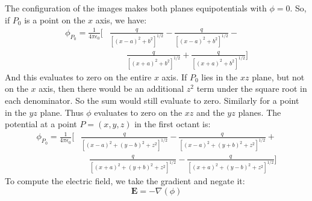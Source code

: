 \documentclass[crop=false,class=book,oneside]{standalone}
\begin{document}
            \begin{solution}
                The configuration of the images makes both planes
                equipotentials with $\phi=0$. So, if
                $P_{0}$ is a point on the $x$ axis, we have:
                \begin{equation}
                    \begin{split}
                        \phi_{P_{0}}=
                        \frac{1}{4\pi\epsilon_{0}}\Big[
                            &
                            \frac{q}{[(x-a)^{2}+b^{2}]^{1/2}}-
                            \frac{q}{[(x-a)^{2}+b^{2}]^{1/2}}-\\
                            &
                            \quad\quad
                            \frac{q}{[(x+a)^{2}+b^{2}]^{1/2}}+
                            \frac{q}{[(x+a)^{2}+b^{2}]^{1/2}}\Big]
                    \end{split}
                \end{equation}
                And this evaluates to zero on the entire $x$ axis.
                If $P_{0}$ lies in the $xz$ plane, but not on the
                $x$ axis, then there would be an additional $z^{2}$
                term under the square root in each denominator. So
                the sum would still evaluate to zero. Similarly for
                a point in the $yz$ plane. Thus $\phi$ evaluates to
                zero on the $xz$ and the $yz$ planes. The potential
                at a point $P=(x,y,z)$ in the first octant is:
                \begin{equation}
                    \begin{split}
                        \phi_{P_{0}}=
                        \frac{1}{4\pi\epsilon_{0}}\Big[
                        &
                        \frac{q}{[(x-a)^{2}+(y-b)^{2}+z^{2}]^{1/2}}-
                        \frac{q}{[(x-a)^{2}+(y+b)^{2}+z^{2}]^{1/2}}+
                        \\
                        &\quad
                        \frac{q}{[(x+a)^{2}+(y+b)^{2}+z^{2}]^{1/2}}-
                        \frac{q}{[(x+a)^{2}+(y-b)^{2}+z^{2}]^{1/2}}
                        \Big]
                    \end{split}
                \end{equation}
                To compute the electric field, we take the gradient
                and negate it:
                \begin{equation}
                    \mathbf{E}=\minus\nabla(\phi)

\end{equation}
\end{solution}
\end{document}
